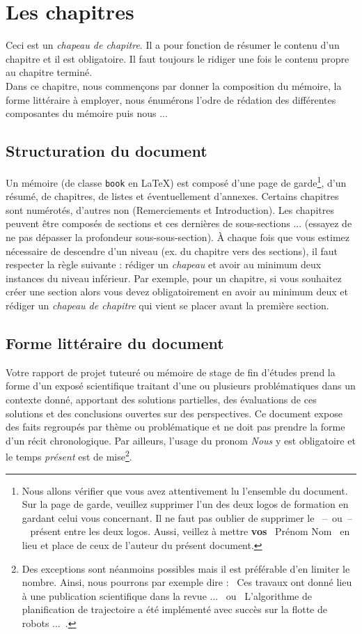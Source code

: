 \documentclass[a4paper, 12pt]{book}
\begin{document}
\chapter{Les chapitres}
Ceci est un \emph{chapeau de chapitre}. Il a pour fonction de résumer
le contenu d'un chapitre et il est obligatoire. Il faut toujours le
ridiger une fois le contenu propre au chapitre terminé.\\


Dans ce chapitre, nous commençons par donner la composition du
mémoire, la forme littéraire à employer, nous énumérons l'odre de
rédation des différentes composantes du mémoire puis nous ...
\section{Structuration du document}
Un mémoire (de classe \texttt{book} en \LaTeX) est composé d'une page
de garde\footnote{Nous allons vérifier que vous avez attentivement lu
  l'ensemble du document. Sur la page de garde, veuillez supprimer
  l'un des deux logos de formation en gardant celui vous
  concernant. Il ne faut pas oublier de supprimer le
  \guillemotleft{}~--~ou~--~\guillemotright{} présent entre les deux
  logos. Aussi, veillez à mettre \textbf{vos} \guillemotleft{}~{Prénom
    \sc Nom}~\guillemotright{} en lieu et place de ceux de l'auteur du
  présent document.}, d'un résumé, de chapitres, de listes et
éventuellement d'annexes. Certains chapitres sont numérotés, d'autres
non (Remerciements et Introduction). Les chapitres peuvent être
composés de sections et ces dernières de sous-sections ... (essayez de
ne pas dépasser la profondeur sous-sous-section). \`A chaque fois que
vous estimez nécessaire de descendre d'un niveau (ex. du chapitre vers
des sections), il faut respecter la règle suivante : rédiger un
\emph{chapeau} et avoir au minimum deux instances du niveau
inférieur. Par exemple, pour un chapitre, si vous souhaitez créer une
section alors vous devez obligatoirement en avoir au minimum deux et
rédiger un \emph{chapeau de chapitre} qui vient se placer avant la
première section.
\section{Forme littéraire du document}
Votre rapport de projet tuteuré ou mémoire de stage de fin d'études
prend la forme d'un exposé scientifique traitant d'une ou plusieurs
problématiques dans un contexte donné, apportant des solutions
partielles, des évaluations de ces solutions et des conclusions
ouvertes sur des perspectives. Ce document expose des faits regroupés
par thème ou problématique et ne doit pas prendre la forme d'un récit
chronologique. Par ailleurs, l'usage du pronom \emph{Nous} y est
obligatoire et le temps \emph{présent} est de mise\footnote{Des
  exceptions sont néanmoins possibles mais il est préférable d'en
  limiter le nombre. Ainsi, nous pourrons par exemple dire :
  \guillemotleft{}~Ces travaux ont donné lieu à une publication
  scientifique dans la revue ...~\guillemotright{} ou
  \guillemotleft{}~L'algorithme de planification de trajectoire a été
  implémenté avec succès sur la flotte de robots
  ...~\guillemotright.}.
\end{document}
